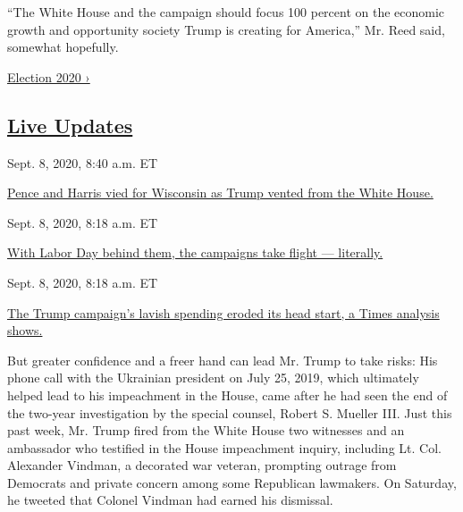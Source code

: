 ``The White House and the campaign should focus 100 percent on the
economic growth and opportunity society Trump is creating for America,''
Mr. Reed said, somewhat hopefully.

\href{https://www.nytimes3xbfgragh.onion/news-event/2020-election}{Election
2020 ›}

\hypertarget{live-updates}{%
\subsection{\texorpdfstring{\href{https://www.nytimes3xbfgragh.onion/live/2020/09/08/us/trump-vs-biden}{Live
Updates}}{Live Updates}}\label{live-updates}}

\href{https://www.nytimes3xbfgragh.onion/live/2020/09/08/us/trump-vs-biden\#pence-and-harris-vied-for-wisconsin-as-trump-vented-from-the-white-house}{}

Sept. 8, 2020, 8:40 a.m. ET

\href{https://www.nytimes3xbfgragh.onion/live/2020/09/08/us/trump-vs-biden\#pence-and-harris-vied-for-wisconsin-as-trump-vented-from-the-white-house}{Pence
and Harris vied for Wisconsin as Trump vented from the White
House.}\href{https://www.nytimes3xbfgragh.onion/live/2020/09/08/us/trump-vs-biden\#with-labor-day-behind-them-the-campaigns-take-flight-literally}{}

Sept. 8, 2020, 8:18 a.m. ET

\href{https://www.nytimes3xbfgragh.onion/live/2020/09/08/us/trump-vs-biden\#with-labor-day-behind-them-the-campaigns-take-flight-literally}{With
Labor Day behind them, the campaigns take flight ---
literally.}\href{https://www.nytimes3xbfgragh.onion/live/2020/09/08/us/trump-vs-biden\#the-trump-campaigns-lavish-spending-eroded-its-head-start-a-times-analysis-shows}{}

Sept. 8, 2020, 8:18 a.m. ET

\href{https://www.nytimes3xbfgragh.onion/live/2020/09/08/us/trump-vs-biden\#the-trump-campaigns-lavish-spending-eroded-its-head-start-a-times-analysis-shows}{The
Trump campaign's lavish spending eroded its head start, a Times analysis
shows.}

But greater confidence and a freer hand can lead Mr. Trump to take
risks: His phone call with the Ukrainian president on July 25, 2019,
which ultimately helped lead to his impeachment in the House, came after
he had seen the end of the two-year investigation by the special
counsel, Robert S. Mueller III. Just this past week, Mr. Trump fired
from the White House two witnesses and an ambassador who testified in
the House impeachment inquiry, including Lt. Col. Alexander Vindman, a
decorated war veteran, prompting outrage from Democrats and private
concern among some Republican lawmakers. On Saturday, he tweeted that
Colonel Vindman had earned his dismissal.

